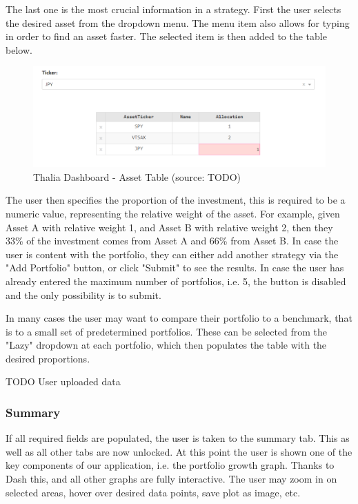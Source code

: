 \documentclass[main.tex]{subfiles}
\begin{document}
The last one is the most crucial information in a strategy. First the user selects the desired asset from the dropdown menu. The menu item also allows for typing in order to find an asset faster. The selected item is then added to the table below.

\begin{figure}[H]
   \centering
   \includegraphics[width=\textwidth]{10Appendices/081User/081Pictures/table.png}
   \caption{Thalia Dashboard - Asset Table (source: TODO)}
   \label{thalia_table}
\end{figure}

The user then specifies the proportion of the investment, this is required to be a numeric value, representing the relative weight of the asset. For example, given Asset A with relative weight 1, and Asset B with relative weight 2, then they 33\% of the investment comes from Asset A and 66\% from Asset B.
In case the user is content with the portfolio, they can either add another strategy via the "Add Portfolio" button, or click "Submit" to see the results. In case the user has already entered the maximum number of portfolios, i.e. 5, the button is disabled and the only possibility is to submit.

In many cases the user may want to compare their portfolio to a benchmark, that is to a small set of predetermined portfolios. These can be selected from the "Lazy" dropdown at each portfolio, which then populates the table with the desired proportions.

TODO User uploaded data

\subsubsection*{Summary}

If all required fields are populated, the user is taken to the summary tab. This as well as all other tabs are now unlocked. At this point the user is shown one of the key components of our application, i.e. the portfolio growth graph. Thanks to Dash this, and all other graphs are fully interactive. The user may zoom in on selected areas, hover over desired data points, save plot as image, etc.
\end{document}

